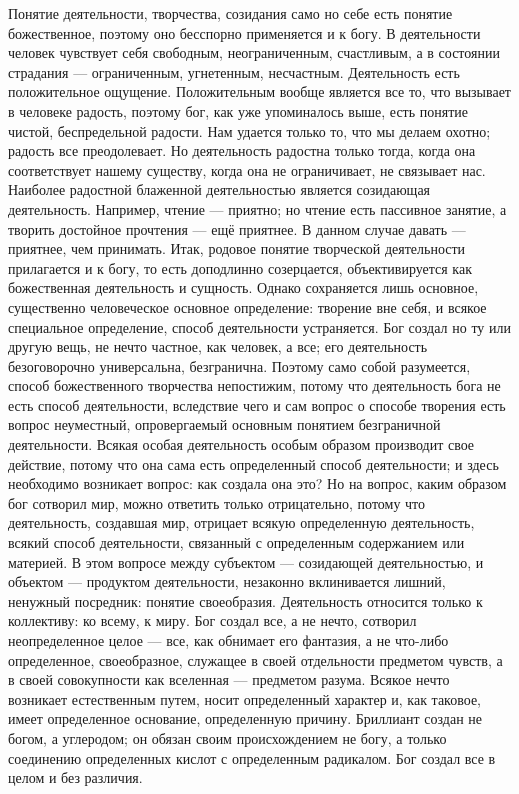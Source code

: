 \documentclass[12pt,oneside]{book}
\begin{document}
Понятие деятельности, творчества, созидания само но себе есть понятие божественное, поэтому оно бесспорно применяется и к богу. В деятельности человек чувствует себя свободным, неограниченным, счастливым, а в состоянии страдания --- ограниченным, угнетенным, несчастным. Деятельность есть положительное ощущение. Положительным вообще является все то, что вызывает в человеке радость, поэтому бог, как уже упоминалось выше, есть понятие чистой, беспредельной радости. Нам удается только то, что мы делаем охотно; радость все преодолевает. Но деятельность радостна только тогда, когда она соответствует нашему существу, когда она не ограничивает, не связывает нас. Наиболее радостной блаженной деятельностью является созидающая деятельность. Например, чтение --- приятно; но чтение есть пассивное занятие, а творить достойное прочтения --- ещё приятнее. В данном случае давать --- приятнее, чем принимать. Итак, родовое понятие творческой деятельности прилагается и к богу, то есть доподлинно созерцается, объективируется как божественная деятельность и сущность. Однако сохраняется лишь основное, существенно человеческое основное определение: творение вне себя, и всякое специальное определение, способ деятельности устраняется. Бог создал но ту или другую вещь, не нечто частное, как человек, а все; его деятельность безоговорочно универсальна, безгранична. Поэтому само собой разумеется, способ божественного творчества непостижим, потому что деятельность бога не есть способ деятельности, вследствие чего и сам вопрос о способе творения есть вопрос неуместный, опровергаемый основным понятием безграничной деятельности. Всякая особая деятельность особым образом производит свое действие, потому что она сама есть определенный способ деятельности; и здесь необходимо возникает вопрос: как создала она это? Но на вопрос, каким образом бог сотворил мир, можно ответить только отрицательно, потому что деятельность, создавшая мир, отрицает всякую определенную деятельность, всякий способ деятельности, связанный с определенным содержанием или материей. В этом вопросе между субъектом --- созидающей деятельностью, и объектом --- продуктом деятельности, незаконно вклинивается лишний, ненужный посредник: понятие своеобразия. Деятельность относится только к коллективу: ко всему, к миру. Бог создал все, а не нечто, сотворил неопределенное целое --- все, как обнимает его фантазия, а не что-либо определенное, своеобразное, служащее в своей отдельности предметом чувств, а в своей совокупности как вселенная --- предметом разума. Всякое нечто возникает естественным путем, носит определенный характер и, как таковое, имеет определенное основание, определенную причину. Бриллиант создан не богом, а углеродом; он обязан своим происхождением не богу, а только соединению определенных кислот с определенным радикалом. Бог создал все в целом и без различия.
\end{document}
